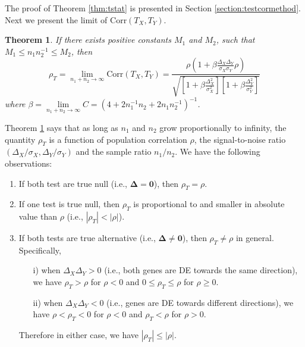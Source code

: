 \documentclass[12pt, a4paper]{article}
\newtheorem{theorem}{Theorem}       %
\newcommand{\cor}{\text{Corr}}
\begin{document}
	The proof of Theorem \ref{thm:tstat} is presented in Section \ref{section:testcormethod}. Next 
	we present the limit of $\cor(T_X, T_Y)$.
	\begin{theorem}\label{thm:rholimit}
	  	If there exists positive constants $M_1$ and $M_2$, such that $M_1 \leq n_1n_2^{-1}\leq 
	  	M_2$, then
	   \begin{equation}\label{eq:limitT}
	   \rho_T=\lim\limits_{n_1 + n_2 \rightarrow \infty} \cor(T_X, T_Y) = \frac{\rho(1  +
	   	\beta\frac{\Delta_X\Delta_Y}{\sigma_X\sigma_Y}\rho)}{\sqrt{  \left[ 1 +\beta\frac{\Delta_X^2}{\sigma_X^2}\right]\left[ 1 + \beta\frac{\Delta_Y^2}{\sigma_Y^2}\right]}}
	   \end{equation}
	   where %
	   $\beta = \lim\limits_{n_1 + n_2 \rightarrow \infty}C = (4 + 2n_1^{-1}n_2 + 2n_1n_2^{-1})^{-1}$.
	\end{theorem}
	Theorem \ref{thm:rholimit} says that as long as $n_1$ and $n_2$ grow proportionally to 
	infinity, the quantity $\rho_T$ is a function of population correlation $\rho$, the 
	signal-to-noise ratio $(\Delta_X/\sigma_X, \Delta_Y/\sigma_Y)$  and the sample ratio $n_1/n_2$. 
	We have the following observations:
	\begin{enumerate}
		\item If both test are true null (i.e., $\bm \Delta = \bm 0$), then $\rho_T = \rho$.
		\item If one test is true null, then $\rho_T$ is proportional to and smaller in absolute value than $\rho$ (i.e., $|\rho_T|< |\rho|$).
		\item If both tests are true alternative (i.e., $\bm \Delta \neq \bm 0$), then $\rho_T\neq \rho$ in general. Specifically,
			\begin{enumerate}
				\item[i)]  when $\Delta_X\Delta_Y >0$ (i.e., both genes are DE towards the same direction), we have $\rho_T>\rho$ for $\rho <0$ and $0 \leq \rho_T \leq\rho$ for $\rho \geq 0$.
				\item[ii)] when $\Delta_X\Delta_Y <0$ (i.e., genes are DE towards different directions), we have
				$\rho <\rho_T<0$ for $\rho <0$ and $\rho_T<\rho$ for $\rho>0$.
			\end{enumerate}
		Therefore in either case, we have $|\rho_T| \leq |\rho|$. 
		\end{enumerate}
		
		
			
\end{document}
